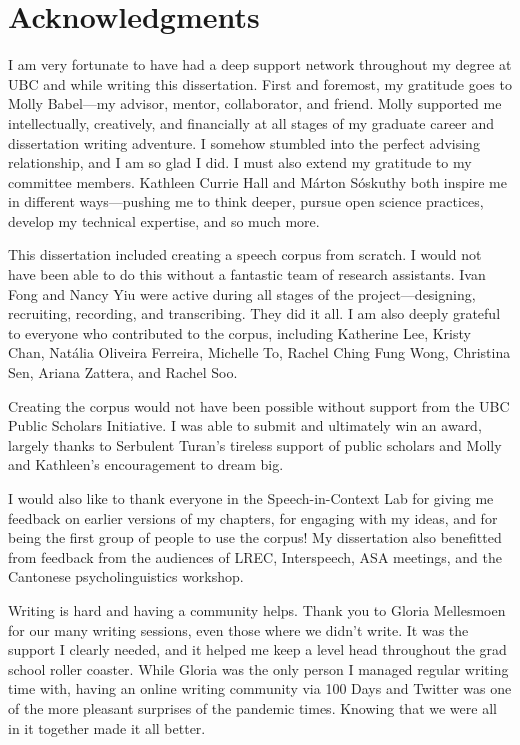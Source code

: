 
\chapter{Acknowledgments}

I am very fortunate to have had a deep support network throughout my degree at UBC and while writing this dissertation. First and foremost, my gratitude goes to Molly Babel---my advisor, mentor, collaborator, and friend. Molly supported me intellectually, creatively, and financially at all stages of my graduate career and dissertation writing adventure. I somehow stumbled into the perfect advising relationship, and I am so glad I did. I must also extend my gratitude to my committee members. Kathleen Currie Hall and Márton Sóskuthy both inspire me in different ways---pushing me to think deeper, pursue open science practices, develop my technical expertise, and so much more. 

This dissertation included creating a speech corpus from scratch. I would not have been able to do this without a fantastic team of research assistants. Ivan Fong and Nancy Yiu were active during all stages of the project---designing, recruiting, recording, and transcribing. They did it all. I am also deeply grateful to everyone who contributed to the corpus, including Katherine Lee, Kristy Chan, Natália Oliveira Ferreira, Michelle To, Rachel Ching Fung Wong, Christina Sen, Ariana Zattera, and Rachel Soo. 

Creating the corpus would not have been possible without support from the UBC Public Scholars Initiative. I was able to submit and ultimately win an award, largely thanks to Serbulent Turan's tireless support of public scholars and Molly and Kathleen's encouragement to dream big. 

I would also like to thank everyone in the Speech-in-Context Lab for giving me feedback on earlier versions of my chapters, for engaging with my ideas, and for being the first group of people to use the corpus! My dissertation also benefitted from feedback from the audiences of LREC, Interspeech, ASA meetings, and the Cantonese psycholinguistics workshop.

Writing is hard and having a community helps. Thank you to Gloria Mellesmoen for our many writing sessions, even those where we didn't write. It was the support I clearly needed, and it helped me keep a level head throughout the grad school roller coaster. While Gloria was the only person I managed regular writing time with, having an online writing community via 100 Days and Twitter was one of the more pleasant surprises of the pandemic times. Knowing that we were all in it together made it all better.

